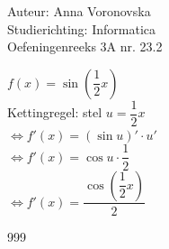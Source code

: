 \documentclass[a4paper]{article}
\begin{document}
  
\noindent \large Auteur: Anna Voronovska \\
\noindent \large Studierichting: Informatica\\
\noindent \large Oefeningenreeks 3A nr. 23.2\\

\medskip

\normalsize


$f(x) = \sin\left(\dfrac{1}{2}x\right)$ \\

Kettingregel: stel $u = \dfrac{1}{2}x$ \\

$\Leftrightarrow f'(x) = (\sin u)' \cdot u'$ \\

$\Leftrightarrow f'(x) = \cos u \cdot \dfrac{1}{2}$ \\

$\Leftrightarrow f'(x) = \dfrac{\cos\left(\dfrac{1}{2}x\right)}{2}$




\begin{thebibliography}{999}
\end{thebibliography}
\end{document}
